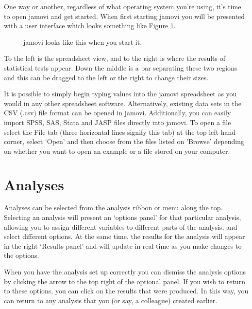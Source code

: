 
One way or another, regardless of what operating system you're using, it's time to open jamovi and get started. When first starting jamovi you will be presented with a user interface which looks something like Figure \ref{fig:startingjamovi}.

\begin{figure}[ht]
\begin{center}
\caption{jamovi looks like this when you start it.}
\label{fig:startingjamovi}
\end{center}
\end{figure}

To the left is the spreadsheet view, and to the right is where the results of statistical tests appear. Down the middle is a bar separating these two regions and this can be dragged to the left or the right to change their sizes. 

It is possible to simply begin typing values into the jamovi spreadsheet as you would in any other spreadsheet software. Alternatively, existing data sets in the CSV (.csv) file format can be opened in jamovi. Additionally, you can easily import SPSS, SAS, Stata and JASP files directly into jamovi. To open a file select the File tab (three horizontal lines signify this tab) at the top left hand corner, select ‘Open’ and then choose from the files listed on 'Browse' depending on whether you want to open an example or a file stored on your computer.


\section{Analyses\label{sec:analyses}}

Analyses can be selected from the analysis ribbon or menu along the top. Selecting an analysis will present an ‘options panel’ for that particular analysis, allowing you to assign different variables to different parts of the analysis, and select different options. At the same time, the results for the analysis will appear in the right ‘Results panel’ and will update in real-time as you make changes to the options.

When you have the analysis set up correctly you can dismiss the analysis options by clicking the arrow to the top right of the optional panel. If you wish to return to these options, you can click on the results that were produced. In this way, you can return to any analysis that you (or say, a colleague) created earlier.

